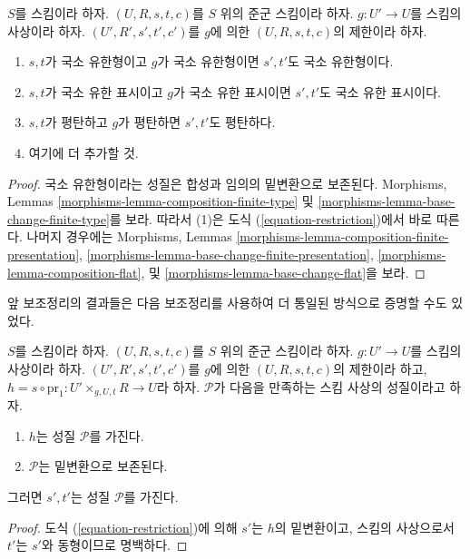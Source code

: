 \begin{lemma}
\label{lemma-restrict-preserves-type}
$S$를 스킴이라 하자.
$(U, R, s, t, c)$를 $S$ 위의 준군 스킴이라 하자.
$g : U' \to U$를 스킴의 사상이라 하자.
$(U', R', s', t', c')$를 $g$에 의한 $(U, R, s, t, c)$의 제한이라 하자.
\begin{enumerate}
\item $s, t$가 국소 유한형이고 $g$가 국소 유한형이면
$s', t'$도 국소 유한형이다.
\item $s, t$가 국소 유한 표시이고 $g$가 국소 유한 표시이면
$s', t'$도 국소 유한 표시이다.
\item $s, t$가 평탄하고 $g$가 평탄하면 $s', t'$도 평탄하다.
\item 여기에 더 추가할 것.
\end{enumerate}
\end{lemma}

\begin{proof}
국소 유한형이라는 성질은 합성과 임의의 밑변환으로 보존된다.
Morphisms, Lemmas \ref{morphisms-lemma-composition-finite-type} 및
\ref{morphisms-lemma-base-change-finite-type}를 보라.
따라서 (1)은 도식 (\ref{equation-restriction})에서 바로 따른다.
나머지 경우에는 Morphisms, Lemmas
\ref{morphisms-lemma-composition-finite-presentation},
\ref{morphisms-lemma-base-change-finite-presentation},
\ref{morphisms-lemma-composition-flat}, 및
\ref{morphisms-lemma-base-change-flat}을 보라.
\end{proof}

\noindent
앞 보조정리의 결과들은 다음 보조정리를 사용하여 더 통일된 방식으로
증명할 수도 있었다.

\begin{lemma}
\label{lemma-restrict-property}
$S$를 스킴이라 하자.
$(U, R, s, t, c)$를 $S$ 위의 준군 스킴이라 하자.
$g : U' \to U$를 스킴의 사상이라 하자.
$(U', R', s', t', c')$를 $g$에 의한 $(U, R, s, t, c)$의 제한이라 하고,
$h = s \circ \text{pr}_1 : U' \times_{g, U, t} R \to U$라 하자.
$\mathcal{P}$가 다음을 만족하는 스킴 사상의 성질이라고 하자.
\begin{enumerate}
\item $h$는 성질 $\mathcal{P}$를 가진다.
\item $\mathcal{P}$는 밑변환으로 보존된다.
\end{enumerate}
그러면 $s', t'$는 성질 $\mathcal{P}$를 가진다.
\end{lemma}

\begin{proof}
도식 (\ref{equation-restriction})에 의해 $s'$는 $h$의 밑변환이고,
스킴의 사상으로서 $t'$는 $s'$와 동형이므로 명백하다.
\end{proof}

